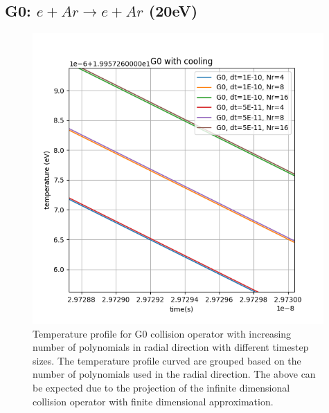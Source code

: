 \documentclass{article}
\begin{document}
\subsection{G0: $e + Ar \rightarrow e + Ar $ (20eV)}
\begin{figure}[H]
    \centering
    \includegraphics[width=0.99\textwidth]{dat/g0_temp_profile.png}
    \caption{Temperature profile for G0 collision operator with increasing number of polynomials in radial direction with different timestep sizes. The temperature profile curved are grouped based on the number of polynomials used in the radial direction. The above can be expected due to the projection of the infinite dimensional collision operator with finite dimensional approximation. }
\end{figure}
\end{document}
